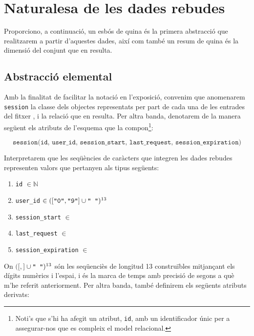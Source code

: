 \documentclass[
	a4paper,
	twoside,
	justified
]{tufte-book}
\begin{document}
\section{Naturalesa de les dades rebudes}
\label{sec:natu_dades_rebudes}

Proporciono, a continuació, un esbós de quina és la primera abstracció que realitzarem a partir d'aquestes dades, així com també un resum de quina és la dimensió del conjunt que en resulta. 

\subsection{Abstracció elemental}

Amb la finalitat de facilitar la notació en l'exposició, convenim que anomenarem \texttt{session} la classe dels objectes representats per part de cada una de les entrades del fitxer , i  la relació que en resulta. Per altra banda, denotarem de la manera següent els atributs de l'esquema que la compon\footnote[][-2\baselineskip]{Noti's que s'hi ha afegit un atribut, \texttt{id}, amb un identificador únic per a assegurar-nos que es compleix el model relacional.}:

$$
\texttt{session(id, user\_id, session\_start, last\_request, session\_expiration)}
$$

Interpretarem que les seqüències de caràcters que integren les dades rebudes representen valors que pertanyen als tipus següents:

\begin{enumerate}[(1)]
	\item \texttt{id} $\in \mathbb{N}$
	\item \texttt{user\_id} $\in ([\texttt{``0''},\texttt{``9''}] \cup \texttt{`` ''})^{13}$
	\item \texttt{session\_start} $\in$ 
	\item \texttt{last\_request} $\in$ 
	\item \texttt{session\_expiration} $\in$ 
\end{enumerate}

On $([$$,$$]\cup \texttt{`` ''})^{13}$ són les seqüenciès de longitud 13 construïbles mitjançant els dígits numèrics i l'espai, i  és la marca de temps amb precisió de segons a què m'he referit anteriorment. Per altra banda, també definirem els següents atributs derivats:
\end{document}
